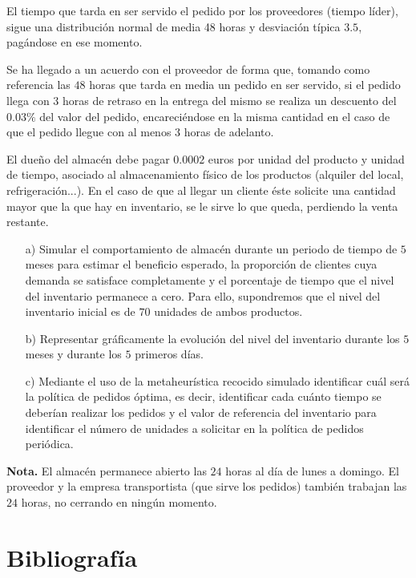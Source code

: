 \documentclass[a4paper,12pt]{article}
\begin{document}
	El tiempo que tarda en ser servido el pedido por los proveedores (tiempo líder),
sigue una distribución normal de media 48 horas y desviación típica $3.5$,
pagándose en ese momento.
	
	Se ha llegado a un acuerdo con el proveedor de forma que, tomando como
referencia las $48$ horas que tarda en media un pedido en ser servido, si el pedido
llega con $3$ horas de retraso en la entrega del mismo se realiza un descuento del $0.03\%$ del valor del pedido, encareciéndose en la misma cantidad en el caso de
que el pedido llegue con al menos $3$ horas de adelanto.

	
	El dueño del almacén debe pagar $0.0002$ euros por unidad del producto y
unidad de tiempo, asociado al almacenamiento físico de los productos (alquiler
del local, refrigeración...).
En el caso de que al llegar un cliente éste solicite una cantidad mayor que la que
hay en inventario, se le sirve lo que queda, perdiendo la venta restante.
	
	\begin{enumerate}
		\item[a)] Simular el comportamiento de almacén durante un periodo de tiempo de $5$
meses para estimar el beneficio esperado, la proporción de clientes cuya
demanda se satisface completamente y el porcentaje de tiempo que el nivel del
inventario permanece a cero. Para ello, supondremos que el nivel del inventario
inicial es de $70$ unidades de ambos productos.
		\item[b)] Representar gráficamente la evolución del nivel del inventario durante los $5$
meses y durante los $5$ primeros días.
		\item[c)] Mediante el uso de la metaheurística recocido simulado identificar cuál será la
política de pedidos óptima, es decir, identificar cada cuánto tiempo se deberían
realizar los pedidos y el valor de referencia del inventario para identificar el
número de unidades a solicitar en la política de pedidos periódica.
	\end{enumerate}

	\textbf{Nota.} El almacén permanece abierto las $24$ horas al día de lunes a domingo. El
proveedor y la empresa transportista (que sirve los pedidos) también trabajan
las $24$ horas, no cerrando en ningún momento.
	
	
	
\newpage
	\section*{Bibliografía}
	
	
	
\end{document}
